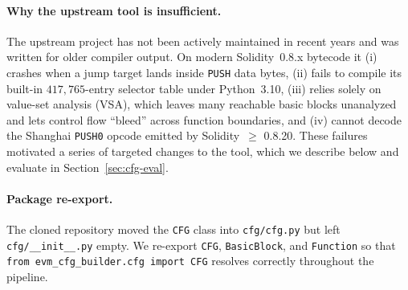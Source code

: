 \documentclass{stylefiles/capstone}
\begin{document}
\paragraph{Why the upstream tool is insufficient.}
The upstream project has not been actively maintained in recent years and was
written for older compiler output. On modern Solidity~0.8.x bytecode it (i)
crashes when a jump target lands inside \texttt{PUSH} data bytes, (ii) fails to
compile its built-in $417{,}765$-entry selector table under Python~3.10, (iii)
relies solely on value-set analysis (VSA), which leaves many reachable basic
blocks unanalyzed and lets control flow ``bleed'' across function boundaries, and
(iv) cannot decode the Shanghai \texttt{PUSH0} opcode emitted by Solidity~$\geq$
0.8.20. These failures motivated a series of targeted changes to the tool, which
we describe below and evaluate in Section~\ref{sec:cfg-eval}.

\paragraph{Package re-export.}
The cloned repository moved the \texttt{CFG} class into
\texttt{cfg/cfg.py} but left \texttt{cfg/\_\_init\_\_.py} empty. We re-export
\texttt{CFG}, \texttt{BasicBlock}, and \texttt{Function} so that
\texttt{from evm\_cfg\_builder.cfg import CFG} resolves correctly throughout the
pipeline.
\end{document}
